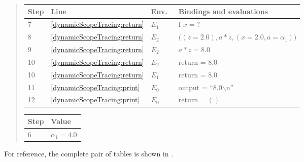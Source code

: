 \documentclass[fsharpNotes.tex]{subfiles}
\begin{document}
\begin{quote}
  \begin{tabular*}{0.65\linewidth}[t]{l|lll}
    Step & Line & Env.\ & Bindings and evaluations\\
    \hline
    7 &\ref{dynamicScopeTracing:return} & $E_1$ & $\text{f } x = \text{?}$\\
    8 &\ref{dynamicScopeTracing:return} & $E_2$ & $\big((z = 2.0), a*z, (x=2.0, a=\alpha_1)\big)$\\
    9 &\ref{dynamicScopeTracing:return} & $E_2$ & $a * z = 8.0$\\
    10 &\ref{dynamicScopeTracing:return} & $E_2$ & return = $8.0$\\
    10 &\ref{dynamicScopeTracing:return} & $E_1$ & return = $8.0$\\
    11 &\ref{dynamicScopeTracing:print} & $E_0$ & output = ``8.0$\backslash$n''\\
    12 &\ref{dynamicScopeTracing:print} & $E_0$ & $\text{return} = ()$\\
  \end{tabular*}
  \hspace*{0.03\linewidth}
  \begin{tabular*}{0.25\linewidth}[t]{l|l}
    Step & Value\\
    \hline
    6 & $\alpha_1 = 4.0$\\
  \end{tabular*}
\end{quote}
For reference, the complete pair of tables is shown in .
\end{document}
